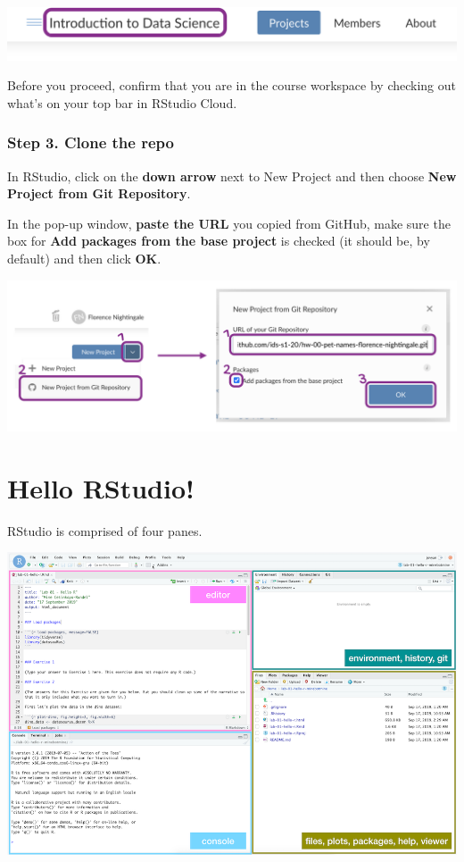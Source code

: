 \documentclass[
]{article}
\begin{document}
\includegraphics[width=0.8\linewidth]{img/course-workspace}

Before you proceed, confirm that you are in the course workspace by
checking out what's on your top bar in RStudio Cloud.

\subsubsection{Step 3. Clone the repo}\label{step-3.-clone-the-repo}

In RStudio, click on the \textbf{down arrow} next to New Project and
then choose \textbf{New Project from Git Repository}.

In the pop-up window, \textbf{paste the URL} you copied from GitHub,
make sure the box for \textbf{Add packages from the base project} is
checked (it should be, by default) and then click \textbf{OK}.

\begin{flushleft}\includegraphics[width=0.8\linewidth]{img/new-project-from-git} \end{flushleft}

\section{Hello RStudio!}\label{hello-rstudio}

RStudio is comprised of four panes.

\includegraphics[width=0.8\linewidth]{img/rstudio-anatomy}
\end{document}
